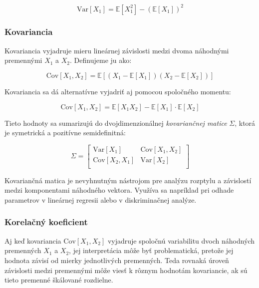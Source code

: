 \begin{equation}
\mathrm{Var}[X_1] = \mathbb{E}[X_1^2] - (\mathbb{E}[X_1])^2
\end{equation}

\subsubsection{Kovariancia}\label{subsubsec:joint_covariance}

Kovariancia vyjadruje mieru lineárnej závislosti medzi dvoma náhodnými premennými \(X_1\) a \(X_2\). Definujeme ju ako:

\begin{equation}
\mathrm{Cov}[X_1, X_2] = \mathbb{E}[(X_1 - \mathbb{E}[X_1])(X_2 - \mathbb{E}[X_2])]
\end{equation}

Kovariancia sa dá alternatívne vyjadriť aj pomocou spoločného momentu:

\begin{equation}
\mathrm{Cov}[X_1, X_2] = \mathbb{E}[X_1 X_2] - \mathbb{E}[X_1] \cdot \mathbb{E}[X_2]
\end{equation}

Tieto hodnoty sa sumarizujú do dvojdimenzionálnej \textit{kovariančnej matice} \(\Sigma\), ktorá je symetrická a pozitívne semidefinitná:

\begin{equation}
\Sigma = 
\begin{bmatrix}
\mathrm{Var}[X_1] & \mathrm{Cov}[X_1, X_2] \\
\mathrm{Cov}[X_2, X_1] & \mathrm{Var}[X_2] \\
\end{bmatrix}
\end{equation}

Kovariančná matica je nevyhnutným nástrojom pre analýzu rozptylu a závislostí medzi komponentami náhodného vektora. Využíva sa napríklad pri odhade parametrov v lineárnej regresii alebo v diskriminačnej analýze.

\subsubsection{Korelačný koeficient}\label{subsubsec:correlation}

Aj keď kovariancia $\mathrm{Cov}[X_1, X_2]$ vyjadruje spoločnú variabilitu dvoch náhodných premenných $X_1$ a $X_2$, jej interpretácia môže byť problematická, pretože jej hodnota závisí od mierky jednotlivých premenných. Teda rovnaká úroveň závislosti medzi premennými môže viesť k rôznym hodnotám kovariancie, ak sú tieto premenné škálované rozdielne.

